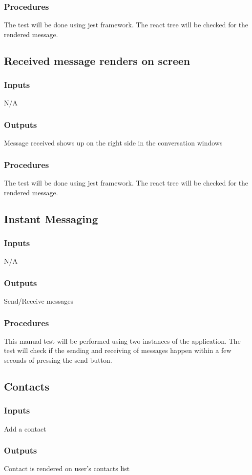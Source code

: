 \documentclass[12pt, titlepage]{article}
\begin{document}
\subsubsection{Procedures}
The test will be done using jest framework. The react tree will be checked for the rendered message.
\subsection{Received message renders on screen}
\subsubsection{Inputs}
N/A
\subsubsection{Outputs}
Message received shows up on the right side in the conversation windows
\subsubsection{Procedures}
The test will be done using jest framework. The react tree will be checked for the rendered message.
\subsection{Instant Messaging}
\subsubsection{Inputs}
N/A
\subsubsection{Outputs}
Send/Receive messages
\subsubsection{Procedures}
This manual test will be performed using two instances of the application. The test will check if the sending and receiving of messages happen within a few seconds of pressing the send button.
\subsection{Contacts}
\subsubsection{Inputs}
Add a contact
\subsubsection{Outputs}
Contact is rendered on user's contacts list
\end{document}
